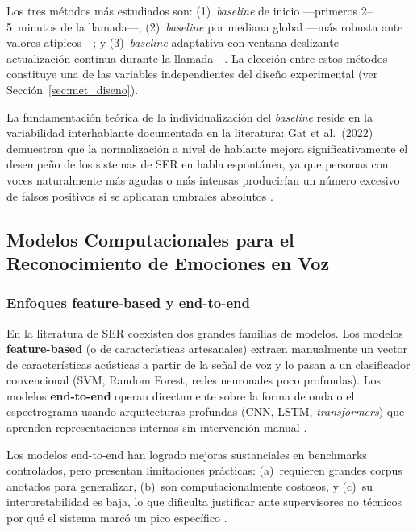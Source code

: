 Los tres métodos más estudiados son: (1)~\textit{baseline} de inicio ---primeros
2--5~minutos de la llamada---; (2)~\textit{baseline} por mediana global ---más robusta
ante valores atípicos---; y (3)~\textit{baseline} adaptativa con ventana deslizante
---actualización continua durante la llamada---. La elección entre estos métodos
constituye una de las variables independientes del diseño experimental (ver
Sección~\ref{sec:met_diseno}).

La fundamentación teórica de la individualización del \textit{baseline} reside en la
variabilidad interhablante documentada en la literatura: Gat et al.\ (2022) demuestran
que la normalización a nivel de hablante mejora significativamente el desempeño de los
sistemas de SER en habla espontánea, ya que personas con voces naturalmente más agudas
o más intensas producirían un número excesivo de falsos positivos si se aplicaran
umbrales absolutos \cite{gat2022}.

\subsection{Modelos Computacionales para el Reconocimiento de Emociones en Voz}
\label{sec:rt_modelos}

\subsubsection{Enfoques feature-based y end-to-end}

En la literatura de SER coexisten dos grandes familias de modelos. Los modelos
\textbf{feature-based} (o de características artesanales) extraen manualmente un
vector de características acústicas a partir de la señal de voz y lo pasan a un
clasificador convencional (SVM, Random Forest, redes neuronales poco profundas).
Los modelos \textbf{end-to-end} operan directamente sobre la forma de onda o el
espectrograma usando arquitecturas profundas (CNN, LSTM, \textit{transformers}) que
aprenden representaciones internas sin intervención manual \cite{khare2024}.

Los modelos end-to-end han logrado mejoras sustanciales en benchmarks controlados,
pero presentan limitaciones prácticas: (a)~requieren grandes corpus anotados para
generalizar, (b)~son computacionalmente costosos, y (c)~su interpretabilidad es baja,
lo que dificulta justificar ante supervisores no técnicos por qué el sistema marcó un
pico específico \cite{wagner2023, delope2023}.

